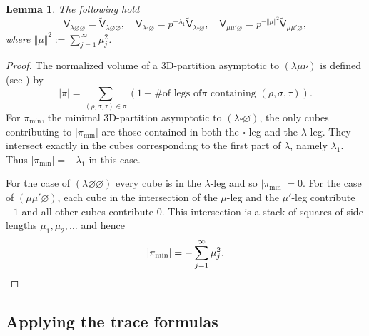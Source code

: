 \documentclass[12pt]{amsart}
\newtheorem{lemma}[theorem]{Lemma}
\theoremstyle{definition}
\newcommand{\sfV}{\mathsf{V}}
\newcommand{\sfVtilde}{\widetilde{\mathsf{V}}}
\renewcommand{\emptyset}{\varnothing}
\newcommand{\bx}{\square}
\newcommand{\SubSecSpace}{$\,$\vspace{0.2cm}\par } %
\begin{document}
\begin{lemma}\label{lem: normalized vertex in terms of usual vertex}
The following hold 
\[
\sfV_{\lambda \emptyset \emptyset} =\sfVtilde_{\lambda \emptyset
\emptyset}, \quad \sfV_{\lambda \bx \emptyset} = p^{-\lambda_{1}}
\sfVtilde_{\lambda \bx \emptyset}, \quad \sfV_{\mu \mu' \emptyset}
=p^{-\Vert \mu \Vert^{2}} \sfVtilde_{\mu \mu' \emptyset},
\]
where $\Vert \mu \Vert^{2}:= \sum_{j=1}^{\infty} \mu_{j}^{2}$.
\end{lemma}
\begin{proof}
The normalized volume of a 3D-partition asymptotic to $(\lambda \mu
\nu )$ is defined (see \cite[page~2]{Bryan-Kool-Young}) by
\[
|\pi | = \sum_{(\rho ,\sigma ,\tau )\in \pi} (1-\text{\# of legs of
$\pi$ containing $(\rho ,\sigma ,\tau )$}) .
\]
For $\pi_{\min}$, the minimal 3D-partition asymptotic to $(\lambda \bx
\emptyset)$, the only cubes contributing to $|\pi_{\min}|$ are those
contained in both the $\bx$-leg and the $\lambda$-leg. They intersect
exactly in the cubes corresponding to the first part of $\lambda$,
namely $\lambda_{1}$. Thus $|\pi_{\min}|=-\lambda_{1}$ in this case.

For the case of $(\lambda \emptyset \emptyset )$ every cube is in the
$\lambda$-leg and so $|\pi_{\min}|=0$. For the case of $(\mu \mu'
\emptyset )$, each cube in the intersection of the $\mu$-leg and the
$\mu '$-leg contribute $-1$ and all other cubes contribute 0. This
intersection is a stack of squares of side lengths
$\mu_{1},\mu_{2},\dotsc$ and hence
\[
|\pi_{\min}| = -\sum_{j=1}^{\infty} \mu_{j}^{2}. \qedhere
\]
\end{proof}

\subsection{Applying the trace formulas}\SubSecSpace 
\end{document}
